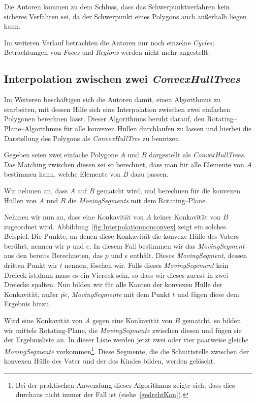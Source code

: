 Die Autoren kommen zu dem Schluss, dass das Schwerpunktverfahren kein sicheres Verfahren sei, da der Schwerpunkt eines Polygons auch außerhalb liegen kann.

Im weiteren Verlauf betrachten die Autoren nur noch einzelne \textit{Cycles}; Betrachtungen von \textit{Faces} und \textit{Regions} werden nicht mehr angestellt.

\subsection{Interpolation zwischen zwei \textit{ConvexHullTrees}}

Im Weiteren beschäftigen sich die Autoren damit, einen Algorithmus zu erarbeiten, mit dessen Hilfe sich eine Interpolation zwischen zwei einfachen Polygonen berechnen lässt. Dieser Algorithmus beruht darauf, den Rotating--Plane--Algorithmus für alle konvexen Hüllen durchlaufen zu lassen und hierbei die Darstellung des Polygons als \textit{ConvexHullTree} zu benutzen.

Gegeben seien  zwei einfache Polygone $A$ und $B$ dargestellt als \textit{ConvexHullTrees}. Das Matching zwischen diesen sei so berechnet, dass man für alle Elemente von $A$ bestimmen kann, welche Elemente von $B$ dazu passen.

Wir nehmen an, dass $A$ auf $B$ gematcht wird, und berechnen für die konvexen Hüllen von $A$ und $B$ die \textit{MovingSegments} mit dem  Rotating--Plane. 

Nehmen wir nun an, dass eine Konkavität von $A$ keiner Konkavität von $B$ zugeordnet wird. Abbildung~\vref{fig:Interpolationnonconvex} zeigt ein solches Beispiel. Die Punkte, an denen diese Konkavität die konvexe Hülle des Vaters berührt, nennen wir $p$ und $e$. In diesem Fall bestimmen wir das \textit{MovingSegment} aus den bereits Berechneten, das $p$ und $e$ enthält. Dieses \textit{MovingSegment}, dessen dritten Punkt wir $t$ nennen, löschen wir. Falls dieses \textit{MovingSegement} kein Dreieck ist,dann muss es ein Viereck sein, so dass wir dieses zuerst in zwei Dreiecke spalten. Nun bilden wir für alle Kanten der konvexen Hülle der Konkavität, außer $\bar{pe}$, \textit{MovingSegmente} mit dem Punkt $t$ und fügen diese dem Ergebnis hinzu.

Wird eine Konkavität von $A$ gegen eine Konkavität von $B$ gematcht, so bilden wir mittels Rotating-Plane, die \textit{MovingSegmente} zwischen diesen und fügen sie der Ergebnisliste an. In dieser Liste werden jetzt zwei oder vier paarweise gleiche \textit{MovingSegmente} vorkommen\footnote{Bei der praktischen Anwendung dieses Algorithmus zeigte sich, dass dies durchaus nicht immer der Fall ist (siehe~\vref{gedrehtKon}).}. Diese Segmente, die die Schnittstelle zwischen der konvexen Hülle des Vater und der des Kindes bilden, werden gelöscht. 

